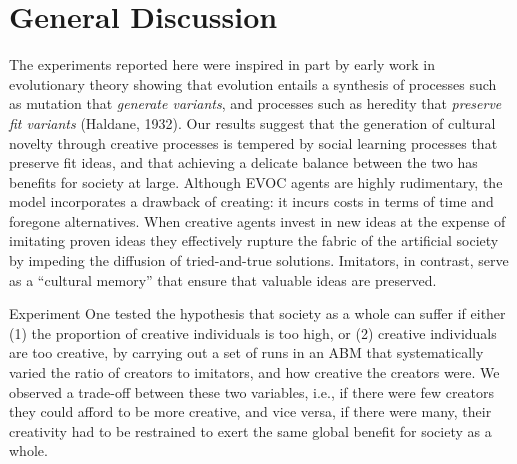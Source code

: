 \documentclass[a4paper,12pt,man,british]{apa6}
\begin{document}
\section{General Discussion}
%
%
The experiments reported here were inspired in part by early work in evolutionary theory showing that evolution entails a synthesis of processes such as mutation that \emph{generate variants}, and processes such as heredity that \emph{preserve fit variants} (Haldane, 1932). Our results suggest that the generation of cultural novelty through creative processes is tempered by social learning processes that preserve fit ideas, and that achieving a delicate balance between the two has benefits for society at large. Although EVOC agents are highly rudimentary, the model incorporates a drawback of creating: it incurs costs in terms of time and foregone alternatives. When creative agents invest in new ideas at the expense of imitating proven ideas they effectively rupture the fabric of the artificial society by impeding the diffusion of tried-and-true solutions. Imitators, in contrast, serve as a ``cultural memory'' that ensure that valuable ideas are preserved. 
 
Experiment One tested the hypothesis that society as a whole can suffer if either (1) the proportion of creative individuals is too high, or (2) creative individuals are too creative, by carrying out a set of runs in an ABM that systematically varied the ratio of creators to imitators, and how creative the creators were. We observed a trade-off between these two variables, i.e., if there were few creators they could afford to be more creative, and vice versa, if there were many, their creativity had to be restrained to exert the same global benefit for society as a whole. 
\end{document}
